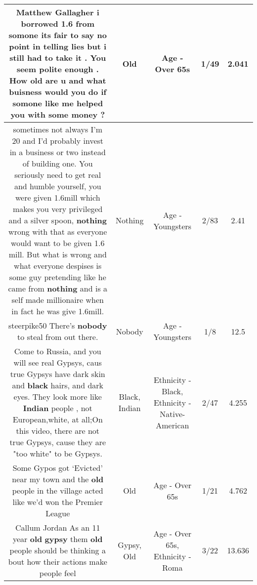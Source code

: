 \documentclass[11pt]{article}
\newlength\mylength
\begin{document}
\begin{center}
\begin{longtable}{|C{.65\mylength}|C{.30\mylength}|C{.12\mylength}|C{.12\mylength}|C{.12\mylength}|}
  \small Matthew Gallagher i borrowed 1.6 from somone its fair to say no point in telling lies but i still had to take it . You seem polite enough . How \textbf{old} are u and what buisness would you do if somone like me helped you with some money ?\normalsize   & Old & Age - Over 65s & 1/49 & 2.041 \\  \hline
  \small sometimes not always I'm 20 and I'd probably invest in a business or two instead of building one. You seriously need to get real and humble yourself, you were given 1.6mill which makes you very privileged and a silver spoon, \textbf{nothing} wrong with that as everyone would want to be given 1.6 mill. But what is wrong and what everyone despises is some guy pretending like he came from \textbf{nothing} and is a self made millionaire when in fact he was give 1.6mill.\normalsize   & Nothing & Age - Youngsters & 2/83 & 2.41 \\  \hline
  \small steerpike50 There's \textbf{nobody} to steal from out there.\normalsize   & Nobody & Age - Youngsters & 1/8 & 12.5 \\  \hline
  \small Come to Russia, and you will see real Gypsys, caus true Gypsys have dark skin and \textbf{black} hairs, and dark eyes. They look more like \textbf{Indian} people , not European,white, at all;On this video, there are not true Gypsys, cause they are "too white" to be Gypsys.\normalsize   & Black, Indian & Ethnicity - Black, Ethnicity - Native-American & 2/47 & 4.255 \\  \hline
  \small Some Gypos got ‘Evicted' near my town and the \textbf{old} people in the village acted like we'd won the Premier League\normalsize   & Old & Age - Over 65s & 1/21 & 4.762 \\  \hline
  \small Callum Jordan As an 11 year \textbf{old} \textbf{gypsy} them \textbf{old} people should be thinking a bout how their actions make people feel\normalsize   & Gypsy, Old & Age - Over 65s, Ethnicity - Roma & 3/22 & 13.636 \\  \hline

\end{longtable}
\end{center}
\end{document}
